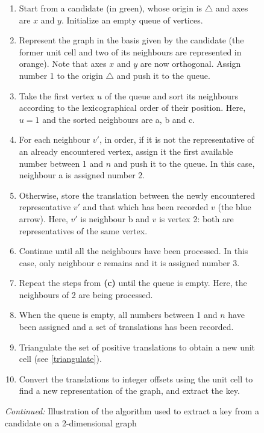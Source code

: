 \documentclass[main.tex]{subfiles}
\begin{document}
\begin{figure}\ContinuedFloat
	\begin{fminipage}{\linewidth}
	\begin{enumerate}[label={\sffamily\small\bfseries(\alph*)},itemsep=0em]
		\item Start from a candidate (in {\color{green!50!black}green}), whose origin is $\boldsymbol\triangle$ and axes are $x$ and $y$. Initialize an empty queue of vertices.
		\item Represent the graph in the basis given by the candidate (the former unit cell and two of its neighbours are represented in {\color{orange}orange}). Note that axes $x$ and $y$ are now orthogonal. Assign number 1 to the origin $\boldsymbol\triangle$ and push it to the queue.
		\item Take the first vertex $u$ of the queue and sort its neighbours according to the lexicographical order of their position. Here, $u = 1$ and the sorted neighbours are a, b and c.
		\item For each neighbour $v'$, in order, if it is not the representative of an already encountered vertex, assign it the first available number between 1 and $n$ and push it to the queue. In this case, neighbour a is assigned number 2.
		\item Otherwise, store the translation between the newly encountered representative $v'$ and that which has been recorded $v$ (the {\color{blue}blue} arrow). Here, $v'$ is neighbour b and $v$ is vertex 2: both are representatives of the same vertex.
		\item Continue until all the neighbours have been processed. In this case, only neighbour c remains and it is assigned number 3.
		\item Repeat the steps from {\sffamily\small\bfseries(c)} until the queue is empty. Here, the neighbours of 2 are being processed.
		\item When the queue is empty, all numbers between 1 and $n$ have been assigned and a set of translations has been recorded.
		\item Triangulate the set of positive translations to obtain a new unit cell (see \cref{triangulate}).
		\item Convert the translations to integer offsets using the unit cell to find a new representation of the graph, and extract the key.
	\end{enumerate}
	\vspace{8mm}
	
	\caption{\emph{Continued:} Illustration of the algorithm used to extract a key from a candidate on a 2-dimensional graph} \label{algocandidate}
	\end{fminipage}
\end{figure}
\end{document}
